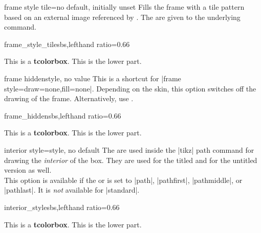 \clearpage
\begin{docTcbKey}{frame style tile}{=}{no default, initially unset}
  Fills the frame with a tile pattern based on an external image referenced by .
  The  are given to the underlying  command.
\begin{exdispExample*}{frame_style_tile}{sbs,lefthand ratio=0.66}

\begin{tcolorbox}[enhanced,title=My title,
  frame style tile={width=1cm}{pink_marble.png}]
This is a \textbf{tcolorbox}.
\tcblower
This is the lower part.
\end{tcolorbox}
\end{exdispExample*}
\end{docTcbKey}


\begin{docTcbKey}{frame hidden}{}{style, no value}
  This is a shortcut for |frame style={draw=none,fill=none}|.
  Depending on the skin, this option switches off the drawing of the
  frame.
  Alternatively, use .
\begin{exdispExample*}{frame_hidden}{sbs,lefthand ratio=0.66}

\begin{tcolorbox}[enhanced,title=My title,
  frame hidden]
This is a \textbf{tcolorbox}.
\tcblower
This is the lower part.
\end{tcolorbox}
\end{exdispExample*}
\end{docTcbKey}


\begin{docTcbKey}{interior style}{=}{style, no default}
  The  are used inside the |tikz| path command
  for drawing the \emph{interior} of the box. They are used for the titled
  and for the untitled version as well.\\
  This option is available if the 
  or  is set to
  |path|, |pathfirst|, |pathmiddle|, or |pathlast|.
  It is \emph{not} available for |standard|.
\begin{exdispExample*}{interior_style}{sbs,lefthand ratio=0.66}

\begin{tcolorbox}[enhanced,title=My title,
  interior style={left color=red!20!white,
                  right color=yellow!50!white}]
This is a \textbf{tcolorbox}.
\tcblower
This is the lower part.
\end{tcolorbox}
\end{exdispExample*}
\end{docTcbKey}

